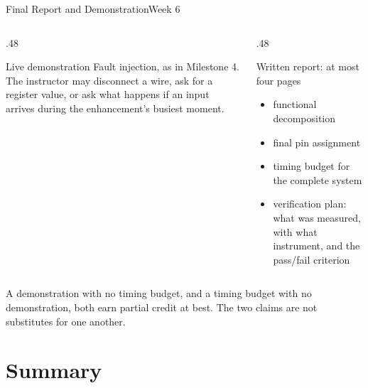 \documentclass[9pt,aspectratio=169,xcolor=table]{beamer}
\begin{document}
\begin{frame}{Final Report and Demonstration}{Week 6}
    \begin{columns}[T]
    \begin{column}{.48\textwidth}
        \begin{block}{Live demonstration}
            {\small Fault injection, as in Milestone 4. The instructor may disconnect a wire, ask for a register value, or ask what happens if an input arrives during the enhancement's busiest moment.}
        \end{block}
    \end{column}
    \begin{column}{.48\textwidth}
        \begin{block}{Written report: at most four pages}
            {\small
            \begin{itemize}\itemsep1pt
                \item functional decomposition
                \item final pin assignment
                \item timing budget for the complete system
                \item verification plan: what was measured, with what instrument, and the pass/fail criterion
            \end{itemize}}
        \end{block}
    \end{column}
    \end{columns}

    \vspace{3mm}
    \alert{A demonstration with no timing budget, and a timing budget with no demonstration, both earn partial credit at best.} The two claims are not substitutes for one another.
\end{frame}


\section{Summary}
\end{document}
